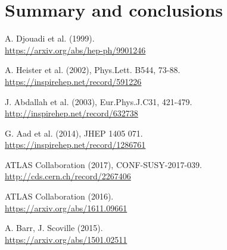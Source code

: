 \documentclass[twocolumn,a4paper,10pt]{article}
\begin{document}
\section{Summary and conclusions}

\begin{thebibliography}{9}


  A. Djouadi et al. (1999). \\
  \href{https://arxiv.org/abs/hep-ph/9901246}{https://arxiv.org/abs/hep-ph/9901246}

  A. Heister et al. (2002), Phys.Lett. B544, 73-88. 
  \href{https://inspirehep.net/record/591226}{https://inspirehep.net/record/591226}
 
  J. Abdallah et al. (2003), Eur.Phys.J.C31, 421-479. 
  \href{http://inspirehep.net/record/632738}{http://inspirehep.net/record/632738}	

  G. Aad et al. (2014), JHEP 1405 071. \\
  \href{https://inspirehep.net/record/1286761}{https://inspirehep.net/record/1286761}

  ATLAS Collaboration (2017), CONF-SUSY-2017-039. 
  \href{http://cds.cern.ch/record/2267406}{http://cds.cern.ch/record/2267406}      

  ATLAS Collaboration (2016). \\
  \href{https://arxiv.org/abs/1611.09661}{https://arxiv.org/abs/1611.09661}   

  A. Barr, J. Scoville (2015). \\ 
  \href{https://arxiv.org/abs/1501.02511}{https://arxiv.org/abs/1501.02511}
 
\end{thebibliography}
\end{document}
